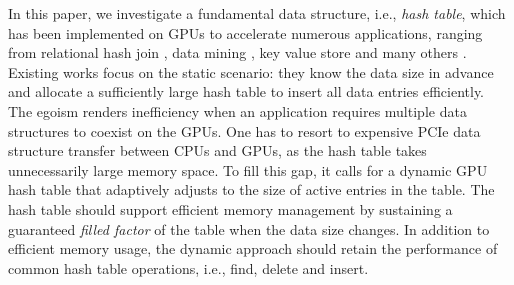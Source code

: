 In this paper, we investigate a fundamental data structure, i.e., \emph{hash table}, which has been implemented on GPUs to accelerate numerous applications, ranging from relational hash join \cite{he2008relational,he2009relational,heimel2013hardware}, data mining \cite{pan2011fast,zhou2010parallel,zhong2014medusa},  key value store \cite{zhang2015mega,hetherington2015memcachedgpu,breslow2016horton} and many others \cite{bowers2010parallel,pan2010efficient,garcia2011coherent,niessner2013real,wu2015gpu}. Existing works \cite{alcantara2009real,zhang2015mega,hong2010mapcg,hetherington2015memcachedgpu,breslow2016horton} focus on the static scenario: they know the data size in advance and allocate a sufficiently large hash table to insert all data entries efficiently. 
The egoism renders inefficiency when an application requires multiple data structures to coexist on the GPUs. One has to resort to expensive PCIe data structure transfer between CPUs and GPUs, as the hash table takes unnecessarily large memory space. 
To fill this gap, it calls for a dynamic GPU hash table that adaptively adjusts to the size of active entries in the table. 
The hash table should support efficient memory management by sustaining a guaranteed \emph{filled factor} of the table when the data size changes. 
In addition to efficient memory usage, the dynamic approach should retain the performance of common hash table operations, i.e., find, delete and insert.


